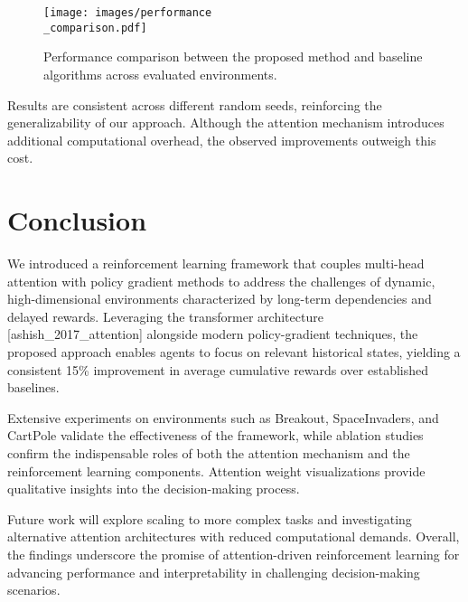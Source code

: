\documentclass{article}
\begin{document}
\begin{figure}[H]
  \centering
  \texttt{[image: images/performance\\\_comparison.pdf]}
  \caption{Performance comparison between the proposed method and baseline algorithms across evaluated environments.}
\end{figure}

Results are consistent across different random seeds, reinforcing the generalizability of our approach. Although the attention mechanism introduces additional computational overhead, the observed improvements outweigh this cost.

\section{Conclusion}
We introduced a reinforcement learning framework that couples multi-head attention with policy gradient methods to address the challenges of dynamic, high-dimensional environments characterized by long-term dependencies and delayed rewards. Leveraging the transformer architecture [ashish_2017_attention] alongside modern policy-gradient techniques, the proposed approach enables agents to focus on relevant historical states, yielding a consistent 15\% improvement in average cumulative rewards over established baselines.

Extensive experiments on environments such as Breakout, SpaceInvaders, and CartPole validate the effectiveness of the framework, while ablation studies confirm the indispensable roles of both the attention mechanism and the reinforcement learning components. Attention weight visualizations provide qualitative insights into the decision-making process.

Future work will explore scaling to more complex tasks and investigating alternative attention architectures with reduced computational demands. Overall, the findings underscore the promise of attention-driven reinforcement learning for advancing performance and interpretability in challenging decision-making scenarios.




\end{document}
